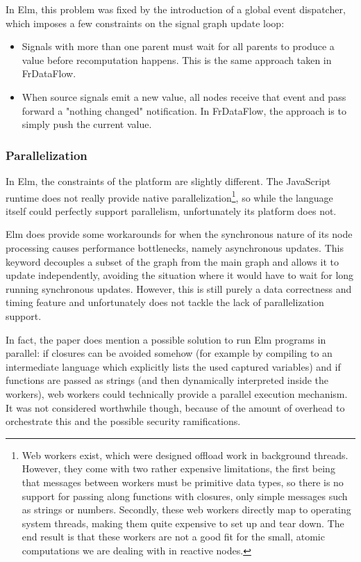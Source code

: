 In Elm, this problem was fixed by the introduction of a global event dispatcher, which imposes a few constraints on the signal graph update loop:

\begin{itemize}
	\item Signals with more than one parent must wait for all parents to produce a value before recomputation happens. This is the same approach taken in FrDataFlow. 
	\item When source signals emit a new value, all nodes receive that event and pass forward a "nothing changed" notification. In FrDataFlow, the approach is to simply push the current value. 
\end{itemize}


\subsubsection{Parallelization}

In Elm, the constraints of the platform are slightly different. The JavaScript runtime does not really provide native parallelization\footnote{Web workers exist, which were designed offload work in background threads. However, they come with two rather expensive limitations, the first being that messages between workers must be primitive data types, so there is no support for passing along functions with closures, only simple messages such as strings or numbers. Secondly, these web workers directly map to operating system threads, making them quite expensive to set up and tear down. The end result is that these workers are not a good fit for the small, atomic computations we are dealing with in reactive nodes.}, so while the language itself could perfectly support parallelism, unfortunately its platform does not. 

Elm does provide some workarounds for when the synchronous nature of its node processing causes performance bottlenecks, namely asynchronous updates. This keyword decouples a subset of the graph from the main graph and allows it to update independently, avoiding the situation where it would have to wait for long running synchronous updates. However, this is still purely a data correctness and timing feature and unfortunately does not tackle the lack of parallelization support.

In fact, the paper does mention a possible solution to run Elm programs in parallel: if closures can be avoided somehow (for example by compiling to an intermediate language which explicitly lists the used captured variables) and if functions are passed as strings (and then dynamically interpreted inside the workers), web workers could technically provide a parallel execution mechanism. It was not considered worthwhile though, because of the amount of overhead to orchestrate this and the possible security ramifications.

